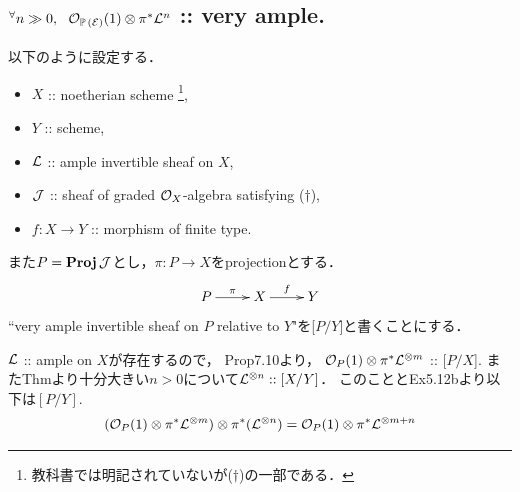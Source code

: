 \documentclass[a4paper]{jsarticle}
\newcommand{\pbundle}{\mathbb{P}\,}
\begin{document}
    \subsection{$\Forall{n \gg 0} \shO_{\pbundle(\shE)}(1) \otimes \pi^* \shL^n$ :: very ample.}
    以下のように設定する．
    \begin{itemize}
        \item $X$ :: noetherian scheme
            \footnote{ 教科書では明記されていないが($\dagger$)の一部である．},
        \item $Y$ :: scheme,
        \item $\mathcal{L}$ :: ample invertible sheaf on $X$,
        \item $\mathcal{J}$ :: sheaf of graded $\mathcal{O}_X$-algebra satisfying ($\dagger$),
        \item $f: X \to Y$ :: morphism of finite type.
    \end{itemize}
    また$P=\mathbf{Proj}\, \mathcal{J}$とし，$\pi: P \to X$をprojectionとする．
    \[
        \xymatrix
        {
            P \ar[r]^-{\pi}& X \ar[r]^-{f}& Y
        }
    \]
    ``very ample invertible sheaf on $P$ relative to $Y$"を[$P/Y$]と書くことにする．

    $\mathcal{L}$ :: ample on $X$が存在するので，
    Prop7.10より，
    $\mathcal{O}_P(1) \otimes \pi^* \mathcal{L}^{\otimes m}$ :: [$P/X$].
    またThmより十分大きい$n>0$について$\mathcal{L}^{\otimes n} :: [X/Y]$．
    このこととEx5.12bより以下は$[P/Y]$.
    \[
        (\mathcal{O}_P(1) \otimes \pi^* \mathcal{L}^{\otimes m}) \otimes \pi^*(\mathcal{L}^{\otimes n})
        =\mathcal{O}_P(1) \otimes \pi^* \mathcal{L}^{\otimes m+n}
    \]
\end{document}
